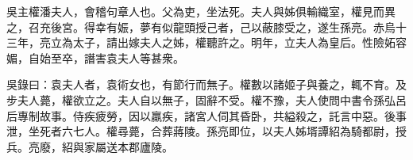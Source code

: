 
\begin{pinyinscope}
吳主權潘夫人，會稽句章人也。父為吏，坐法死。夫人與姊俱輸織室，權見而異之，召充後宮。得幸有娠，夢有似龍頭授己者，己以蔽膝受之，遂生孫亮。赤烏十三年，亮立為太子，請出嫁夫人之姊，權聽許之。明年，立夫人為皇后。性險妬容媚，自始至卒，譖害袁夫人等甚衆。

吳錄曰：袁夫人者，袁術女也，有節行而無子。權數以諸姬子與養之，輒不育。及步夫人薨，權欲立之。夫人自以無子，固辭不受。權不豫，夫人使問中書令孫弘呂后專制故事。侍疾疲勞，因以羸疾，諸宮人伺其昏卧，共縊殺之，託言中惡。後事泄，坐死者六七人。權尋薨，合葬蔣陵。孫亮即位，以夫人姊壻譚紹為騎都尉，授兵。亮廢，紹與家屬送本郡廬陵。


\end{pinyinscope}